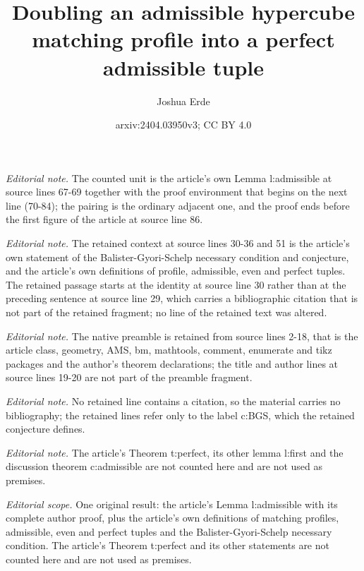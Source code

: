\documentclass{article}
\title{Doubling an admissible hypercube matching profile into a perfect admissible tuple}
\author{Joshua Erde}
\date{arxiv:2404.03950v3; CC BY 4.0}
\begin{document}
\maketitle
\noindent\textit{Editorial note.} The counted unit is the article's own Lemma l:admissible at source lines 67-69 together with the proof environment that begins on the next line (70-84); the pairing is the ordinary adjacent one, and the proof ends before the first figure of the article at source line 86.\par\medskip
\noindent\textit{Editorial note.} The retained context at source lines 30-36 and 51 is the article's own statement of the Balister-Gyori-Schelp necessary condition and conjecture, and the article's own definitions of profile, admissible, even and perfect tuples. The retained passage starts at the identity at source line 30 rather than at the preceding sentence at source line 29, which carries a bibliographic citation that is not part of the retained fragment; no line of the retained text was altered.\par\medskip
\noindent\textit{Editorial note.} The native preamble is retained from source lines 2-18, that is the article class, geometry, AMS, bm, mathtools, comment, enumerate and tikz packages and the author's theorem declarations; the title and author lines at source lines 19-20 are not part of the preamble fragment.\par\medskip
\noindent\textit{Editorial note.} No retained line contains a citation, so the material carries no bibliography; the retained lines refer only to the label c:BGS, which the retained conjecture defines.\par\medskip
\noindent\textit{Editorial note.} The article's Theorem t:perfect, its other lemma l:first and the discussion theorem c:admissible are not counted here and are not used as premises.\par\medskip
\noindent\textit{Editorial scope.} One original result: the article's Lemma l:admissible with its complete author proof, plus the article's own definitions of matching profiles, admissible, even and perfect tuples and the Balister-Gyori-Schelp necessary condition. The article's Theorem t:perfect and its other statements are not counted here and are not used as premises.\par\medskip
\end{document}
